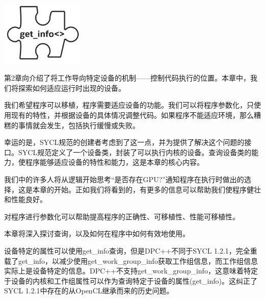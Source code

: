 \begin{center}
	\includegraphics[width=0.3\textwidth]{content/chapter-12/images/1}
\end{center}

第2章向介绍了将工作导向特定设备的机制——控制代码执行的位置。本章中，我们将探索如何适应运行时出现的设备。\par

我们希望程序可以移植，程序需要适应设备的功能。我们可以将程序参数化，只使用现有的特性，并根据设备的具体情况调整代码。如果程序不能适应环境，那么糟糕的事情就会发生，包括执行缓慢或失败。\par

幸运的是，SYCL规范的创建者考虑到了这一点，并为提供了解决这个问题的接口。SYCL规范定义了一个设备类，封装了可以执行内核的设备。查询设备类的能力，使程序能够适应设备的特性和能力，这是本章的核心内容。\par

我们中的许多人将从逻辑开始思考“是否存在GPU?”通知程序在执行时做出的选择，这是本章的开始。正如我们将看到的，有更多的信息可以帮助我们使程序健壮和性能良好。\par

\begin{tcolorbox}[colback=red!5!white,colframe=red!75!black]
对程序进行参数化可以帮助提高程序的正确性、可移植性、性能可移植性。
\end{tcolorbox}

本章将深入探讨查询，以及如何在程序中如何有效地使用。\par

设备特定的属性可以使用get\_info查询，但是DPC++不同于SYCL 1.2.1，完全重载了get\_info，以减少使用get\_work\_group\_info获取工作组信息，而工作组信息实际上是设备特定的信息。DPC++不支持get\_work\_group\_info，这意味着特定于设备的内核和工作组属性可以作为查询特定于设备的属性(get\_info)。这纠正了SYCL 1.2.1中存在的从OpenCL继承而来的历史问题。\par

















































